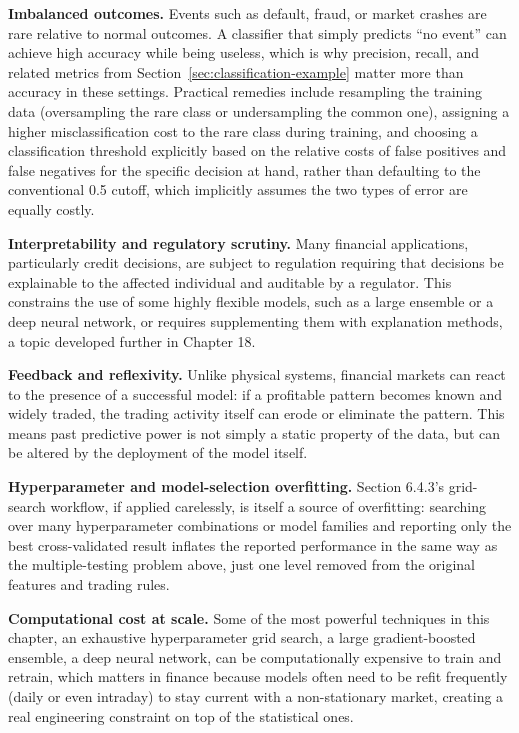\documentclass[../ai_in_finance]{subfiles}
\begin{document}
\textbf{Imbalanced outcomes.} Events such as default, fraud, or market crashes are rare relative to normal outcomes. A classifier that simply predicts ``no event'' can achieve high accuracy while being useless, which is why precision, recall, and related metrics from Section~\ref{sec:classification-example} matter more than accuracy in these settings. Practical remedies include resampling the training data (oversampling the rare class or undersampling the common one), assigning a higher misclassification cost to the rare class during training, and choosing a classification threshold explicitly based on the relative costs of false positives and false negatives for the specific decision at hand, rather than defaulting to the conventional 0.5 cutoff, which implicitly assumes the two types of error are equally costly.

\textbf{Interpretability and regulatory scrutiny.} Many financial applications, particularly credit decisions, are subject to regulation requiring that decisions be explainable to the affected individual and auditable by a regulator. This constrains the use of some highly flexible models, such as a large ensemble or a deep neural network, or requires supplementing them with explanation methods, a topic developed further in Chapter 18.

\textbf{Feedback and reflexivity.} Unlike physical systems, financial markets can react to the presence of a successful model: if a profitable pattern becomes known and widely traded, the trading activity itself can erode or eliminate the pattern. This means past predictive power is not simply a static property of the data, but can be altered by the deployment of the model itself.

\textbf{Hyperparameter and model-selection overfitting.} Section 6.4.3's grid-search workflow, if applied carelessly, is itself a source of overfitting: searching over many hyperparameter combinations or model families and reporting only the best cross-validated result inflates the reported performance in the same way as the multiple-testing problem above, just one level removed from the original features and trading rules.

\textbf{Computational cost at scale.} Some of the most powerful techniques in this chapter, an exhaustive hyperparameter grid search, a large gradient-boosted ensemble, a deep neural network, can be computationally expensive to train and retrain, which matters in finance because models often need to be refit frequently (daily or even intraday) to stay current with a non-stationary market, creating a real engineering constraint on top of the statistical ones.
\end{document}
